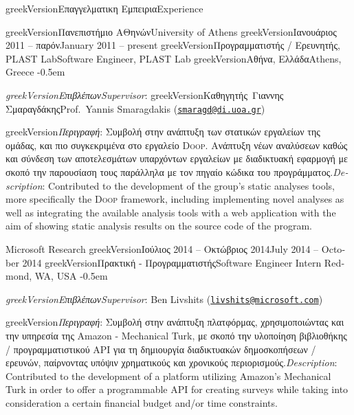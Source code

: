 \documentclass[a4paper]{resume}
\newcommand{\tl}{\textlatin}
\newcommand{\dual}[2]{\ifcsname greekVersion\endcsname #2\else\textlatin{#1}\fi}
\begin{document}
\begin{rSection}{\dual{Experience}{Επαγγελματικη Εμπειρια}}

\begin{rSubsection}
  {\dual{University of Athens}{Πανεπιστήμιο ΑΘηνών}}
  {\dual{January 2011 -- present}{Ιανουάριος 2011 -- παρόν}}
  {\dual{Software Engineer, PLAST Lab}{Προγραμματιστής / Ερευνητής, \tl{PLAST Lab}}}
  {\dual{Athens, Greece}{Αθήνα, Ελλάδα}}
  \itemsep -0.5em
\item[] \emph{\dual{Supervisor}{Επιβλέπων}}: \dual{Prof.~Yannis Smaragdakis}{Καθηγητής~Γιαννης Σμαραγδάκης}
(\href{mailto:smaragd@di.uoa.gr}{\tl{\nolinkurl{smaragd@di.uoa.gr}}})
\item[] \dual
{\emph{Description}: Contributed to the development of the group's static analyses tools, more specifically the \textsc{Doop} framework, including implementing novel analyses as well as integrating the available analysis tools with a web application with the aim of showing static analysis results on the source code of the program.}
{\emph{Περιγραφή}: Συμβολή στην ανάπτυξη των στατικών εργαλείων της ομάδας, και πιο συγκεκριμένα στο εργαλείο \tl{\textsc{Doop}}. Ανάπτυξη νέων αναλύσεων καθώς και σύνδεση των αποτελεσμάτων υπαρχόντων εργαλείων με διαδικτυακή εφαρμογή με σκοπό την παρουσίαση τους παράλληλα με τον πηγαίο κώδικα του προγράμματος.}
\end{rSubsection}


\begin{rSubsection}
  {\tl{Microsoft Research}}
  {\dual{July 2014 -- October 2014}{Ιούλιος 2014 -- Οκτώβριος 2014}}
  {\dual{Software Engineer Intern}{Πρακτική - Προγραμματιστής}}
  {\tl{Redmond, WA, USA}}
  \itemsep -0.5em
\item[] \emph{\dual{Supervisor}{Επιβλέπων}}: \tl{Ben Livshits}
(\href{mailto:livshits@microsoft.com}{\tl{\nolinkurl{livshits@microsoft.com}}})
\item[] \dual
{\emph{Description}: Contributed to the development of a platform utilizing Amazon's Mechanical Turk in order to offer a programmable API for creating surveys while taking into consideration a certain financial budget and/or time constraints.}
{\emph{Περιγραφή}: Συμβολή στην ανάπτυξη πλατφόρμας, χρησιμοποιώντας και την υπηρεσία της \tl{Amazon - Mechanical Turk}, με σκοπό την υλοποίηση βιβλιοθήκης / προγραμματιστικού \tl{API} για τη δημιουργία διαδικτυακών δημοσκοπήσεων / ερευνών, παίρνοντας υπόψιν χρηματικούς και χρονικούς περιορισμούς.}
\end{rSubsection}


\end{rSection}
\end{document}
